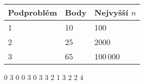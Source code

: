 
\begin{center}
\begin{tabular}{|l|l|l|}
\hline
Podproblém & Body & Nejvyšší $n$  \\ \hline
1       & 10     & 100           \\ \hline
2       & 25     & 2000         \\ \hline
3       & 65     & 100\,000       \\ \hline
\end{tabular}
\end{center}



0 3
0 0
3 0
3 3
2
1 3
2
2 4
\sampleCOMMENT
\sampleEND




